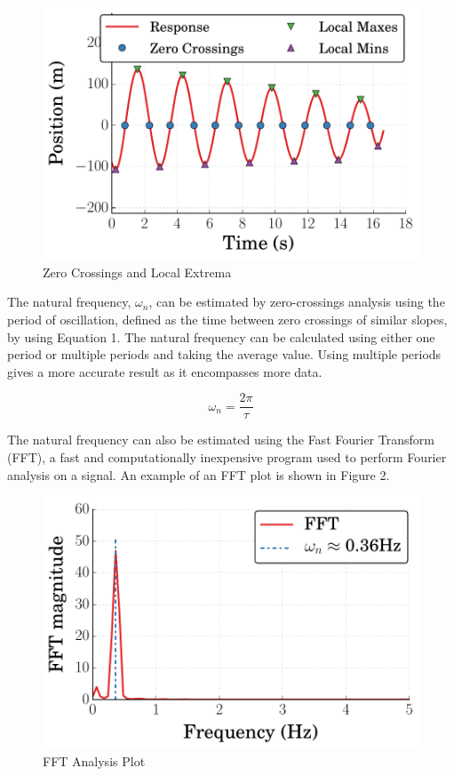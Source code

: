 \documentclass[11pt]{article}
\begin{document}
\begin{figure}[htbp] %
   \centering
   \includegraphics[width=4.5in]{zeroCrossings_and_extrema.pdf} 
   \caption{Zero Crossings and Local Extrema}
   \label{fig:example}
\end{figure}

\bigskip

The natural frequency, $\omega_{n}$, can be estimated by zero-crossings analysis using the period of oscillation, defined as the time between zero crossings of similar slopes, by using Equation 1. The natural frequency can be calculated using either one period or multiple periods and taking the average value. Using multiple periods gives a more accurate result as it encompasses more data. 
\bigskip


\begin{equation}
\omega_{n} = \frac{2\pi}{\tau}
\label{eqn:example}
\end{equation}

\bigskip

The natural frequency can also be estimated using the Fast Fourier Transform (FFT), a fast and computationally inexpensive program used to perform Fourier analysis on a signal. An example of an FFT plot is shown in Figure 2.
\bigskip

\begin{figure}[htbp] %
   \centering
   \includegraphics[width=4.5in]{FFT_magnitude.pdf} 
   \caption{FFT Analysis Plot}
   \label{fig:example}
\end{figure}
\end{document}
